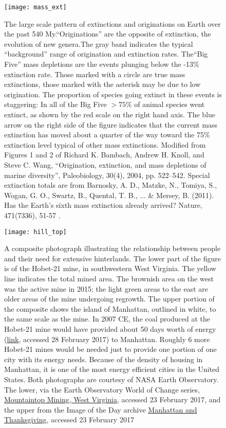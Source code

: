 \documentclass[amstex,12pt]{book}
\begin{document}
\newpage
\begin{figure}[p]
\centering
\texttt{[image: mass\_ext]}%
\caption{The large scale pattern of extinctions and originations on Earth over the past 540 My.``Originations'' are the opposite of extinction, the evolution of new genera.The gray band indicates the typical “background” range of origination and extinction rates. The``Big Five'' mass depletions are the events plunging below the -13\% extinction rate. Those marked with a circle are true mass extinctions, those marked with the asterisk may be due to low origination. The proportion of species going extinct in these events is staggering: In all of the Big Five $>75\%$ of animal species went extinct, as shown by the red scale on the right hand axis. The blue arrow on the right side of the figure indicates that the current mass extinction has moved about a quarter of the way toward the 75\% extinction level typical of other mass extinctions. Modified from Figures 1 and 2 of Richard K. Bambach, Andrew H. Knoll, and Steve C. Wang, “Origination, extinction, and mass depletions of marine diversity”, Paleobiology, 30(4), 2004, pp. 522–542. Special extinction totals are from Barnosky, A. D., Matzke, N., Tomiya, S., Wogan, G. O., Swartz, B., Quental, T. B., ... \& Mersey, B. (2011). Has the Earth's sixth mass extinction already arrived? Nature, 471(7336), 51-57 .}
\label{fig:mass_ext}
\end{figure}

\newpage
\begin{figure}[p]
\centering
\texttt{[image: hill\_top]}%

\caption{A composite photograph illustrating the relationship between people and their need for extensive hinterlands. The lower part of the figure is of the Hobet-21 mine, in southwestern West Virginia. The yellow line indicates the total mined area. The brownish area on the west was the active mine in 2015; the light green areas to the east are older areas of the mine undergoing regrowth. The  upper portion of the composite shows the island of Manhattan, outlined in white, to the same scale as the mine. In 2007 CE, the coal produced at the Hobet-21 mine would have provided about 50 days worth of energy (\href{https://www.nycedc.com/economic-data/july-2013-economic-snapshot}{link}, accessed 28 February 2017) to Manhattan. Roughly 6 more Hobet-21 mines would be needed just to provide one portion of one city with its energy needs. Because of the density of housing in Manhattan, it is one of the most energy efficient cities in the United States. Both photographs are courtesy of NASA Earth Observatory. The lower, via the Earth Observatory World of Change series, \href{http://earthobservatory.nasa.gov/Features/WorldOfChange/hobet.php}{Mountaintop Mining, West Virginia}, accessed 23 February 2017, and the upper from the Image of the Day archive \href{http://earthobservatory.nasa.gov/IOTD/view.php?id=82417}{Manhattan and Thanksgiving}, accessed 23 February 2017}  

\label{fig:hill_top}
\end{figure}
\end{document}

